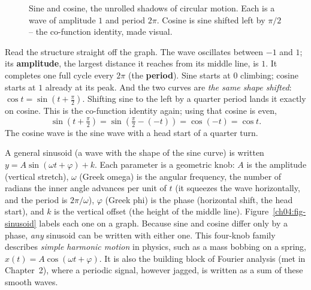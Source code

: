 \begin{figure}[htbp]
\centering
{}
\caption{Sine and cosine, the unrolled shadows of circular motion. Each is a wave of amplitude $1$ and period $2\pi$. Cosine is sine shifted left by $\pi/2$ -- the co-function identity, made visual.}
\label{ch04:fig-sincos-graph}
\end{figure}

Read the structure straight off the graph. The wave oscillates between $-1$ and $1$; its \textbf{amplitude}, the largest distance it reaches from its middle line, is $1$. It completes one full cycle every $2\pi$ (the \textbf{period}). Sine starts at $0$ climbing; cosine starts at $1$ already at its peak. And the two curves are \emph{the same shape shifted}: $\cos t = \sin(t + \tfrac\pi2)$. Shifting sine to the left by a quarter period lands it exactly on cosine. This is the co-function identity again; using that cosine is even,
\[
  \sin\!\left(t+\tfrac\pi2\right) = \sin\!\left(\tfrac\pi2-(-t)\right) = \cos(-t) = \cos t.
\]
The cosine wave is the sine wave with a head start of a quarter turn.

\begin{connectionbox}
A general sinusoid (a wave with the shape of the sine curve) is written $y = A\sin(\omega t + \varphi) + k$. Each parameter is a geometric knob: $A$ is the amplitude (vertical stretch), $\omega$ (Greek omega) is the angular frequency, the number of radians the inner angle advances per unit of $t$ (it squeezes the wave horizontally, and the period is $2\pi/\omega$), $\varphi$ (Greek phi) is the phase (horizontal shift, the head start), and $k$ is the vertical offset (the height of the middle line). Figure~\ref{ch04:fig-sinusoid} labels each one on a graph. Because sine and cosine differ only by a phase, \emph{any} sinusoid can be written with either one. This four-knob family describes \emph{simple harmonic motion} in physics, such as a mass bobbing on a spring, $x(t) = A\cos(\omega t + \varphi)$. It is also the building block of Fourier analysis (met in Chapter~2), where a periodic signal, however jagged, is written as a sum of these smooth waves.
\end{connectionbox}

